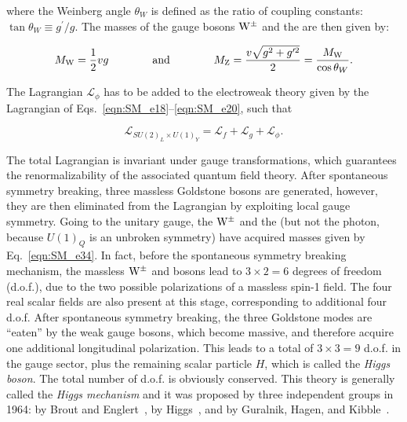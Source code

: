 \noindent where the Weinberg angle $\theta_W$ is defined as the ratio of coupling constants: $\tan\theta_W \equiv g^\prime/g$.
The masses of the gauge bosons $\mathrm{W}^\pm$ and the \PZ are then given by:

\begin{equation}\label{eqn:SM_e34}
M_\mathrm{W} = \frac{1}{2}vg \qquad\qquad \mbox{and} \qquad\qquad M_\mathrm{Z} = \frac{v\sqrt{g^2 + g^{\prime 2}}}{2} = \frac{M_\mathrm{W}}{\cos\theta_W}.
\end{equation}

The Lagrangian $\mathcal{L}_\phi$ has to be added to the electroweak theory given by the Lagrangian of Eqs.~\ref{eqn:SM_e18}--\ref{eqn:SM_e20}, such that

\begin{equation}\label{eqn:SM_e35}
\mathcal{L}_{SU(2)_L \times U(1)_Y} = \mathcal{L}_f + \mathcal{L}_g + \mathcal{L}_\phi.
\end{equation}

The total Lagrangian is invariant under gauge transformations, which guarantees the renormalizability of the associated quantum field theory.
After spontaneous symmetry breaking, three massless Goldstone bosons are generated, however, they are then eliminated from the Lagrangian by exploiting local gauge symmetry.
Going to the unitary gauge, the $\mathrm{W}^\pm$ and the \PZ (but not the photon, because $U(1)_Q$ is an unbroken symmetry) have acquired masses given by Eq.~\ref{eqn:SM_e34}.
In fact, before the spontaneous symmetry breaking mechanism, the massless $\mathrm{W}^\pm$ and \PZ bosons lead to $3\times2 = 6$ degrees of freedom (d.o.f.), due to the two possible polarizations of a massless spin-1 field.
The four real scalar fields are also present at this stage, corresponding to additional four d.o.f.
After spontaneous symmetry breaking, the three Goldstone modes are ``eaten'' by the weak gauge bosons, which become massive, and therefore acquire one additional longitudinal polarization.
This leads to a total of $3 \times 3 = 9$ d.o.f. in the gauge sector, plus the remaining scalar particle $H$, which is called the \textit{Higgs boson}. The total number of d.o.f. is obviously conserved.
This theory is generally called the \textit{Higgs mechanism} and it was proposed by three independent groups in 1964: by Brout and Englert~\cite{PhysRevLett.13.321}, by Higgs~\cite{Higgs1964132,PhysRevLett.13.508,PhysRev.145.1156}, and by Guralnik, Hagen, and Kibble~\cite{PhysRevLett.13.585}.

